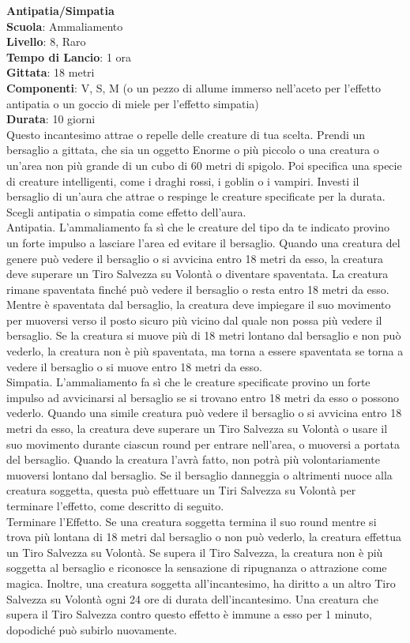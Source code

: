 \begin{multicols}{2}
\medskip\textbf{Antipatia/Simpatia}\\
\textbf{Scuola}: Ammaliamento\\
\textbf{Livello}: 8, Raro\\
\textbf{Tempo di Lancio}: 1 ora\\
\textbf{Gittata}: 18 metri\\
\textbf{Componenti}: V, S, M (o un pezzo di allume immerso nell'aceto per l'effetto antipatia o un goccio di miele per l'effetto simpatia)\\
\textbf{Durata}: 10 giorni\\
Questo incantesimo attrae o repelle delle creature di tua scelta. Prendi un bersaglio a gittata, che sia un oggetto Enorme o più piccolo o una creatura o un'area non più grande di un cubo di 60 metri di spigolo. Poi specifica una specie di creature intelligenti, come i draghi rossi, i goblin o i vampiri. Investi il bersaglio di un'aura che attrae o respinge le creature specificate per la durata. Scegli antipatia o simpatia come effetto dell'aura.\\
Antipatia. L'ammaliamento fa sì che le creature del tipo da te indicato provino un forte impulso a lasciare l'area ed evitare il bersaglio. Quando una creatura del genere può vedere il bersaglio o si avvicina entro 18 metri da esso, la creatura deve superare un Tiro Salvezza su Volontà o diventare spaventata. La creatura rimane spaventata finché può vedere il bersaglio o resta entro 18 metri da esso. Mentre è spaventata dal bersaglio, la creatura deve impiegare il suo movimento per muoversi verso il posto sicuro più vicino dal quale non possa più vedere il bersaglio. Se la creatura si muove più di 18 metri lontano dal bersaglio e non può vederlo, la creatura non è più spaventata, ma torna a essere spaventata se torna a vedere il bersaglio o si muove entro 18 metri da esso.\\
Simpatia. L'ammaliamento fa sì che le creature specificate provino un forte impulso ad avvicinarsi al bersaglio se si trovano entro 18 metri da esso o possono vederlo. Quando una simile creatura può vedere il bersaglio o si avvicina entro 18 metri da esso, la creatura deve superare un Tiro Salvezza su Volontà o usare il suo movimento durante ciascun round per entrare nell'area, o muoversi a portata del bersaglio. Quando la creatura l'avrà fatto, non potrà più volontariamente muoversi lontano dal bersaglio. Se il bersaglio danneggia o altrimenti nuoce alla creatura soggetta, questa può effettuare un Tiri Salvezza su Volontà per terminare l'effetto, come descritto di seguito.\\
Terminare l'Effetto. Se una creatura soggetta termina il suo round mentre si trova più lontana di 18 metri dal bersaglio o non può vederlo, la creatura effettua un Tiro Salvezza su Volontà. Se supera il Tiro Salvezza, la creatura non è più soggetta al bersaglio e riconosce la sensazione di ripugnanza o attrazione come magica. Inoltre, una creatura soggetta all'incantesimo, ha diritto a un altro Tiro Salvezza su Volontà ogni 24 ore di durata dell'incantesimo. Una creatura che supera il Tiro Salvezza contro questo effetto è immune a esso per 1 minuto, dopodiché può subirlo nuovamente.


\end{multicols}
